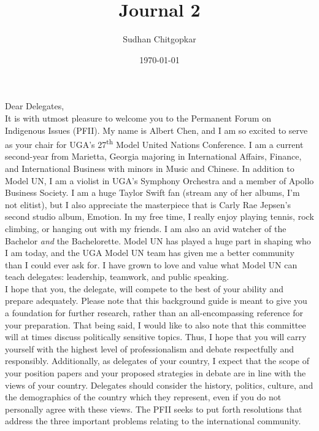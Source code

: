 \documentclass[10pt, letterpaper]{article}
\title{Journal 2}
\author{Sudhan Chitgopkar}
\date{\today}
\begin{document}
Dear Delegates, \\

It is with utmost pleasure to welcome you to the Permanent Forum on
Indigenous Issues (PFII). My name is Albert Chen, and I am so excited to
serve as your chair for UGA's 27\textsuperscript{th} Model United
Nations Conference. I am a current second-year from Marietta, Georgia
majoring in International Affairs, Finance, and International Business
with minors in Music and Chinese. In addition to Model UN, I am a
violist in UGA's Symphony Orchestra and a member of Apollo Business
Society. I am a huge Taylor Swift fan (stream any of her albums, I'm not
elitist), but I also appreciate the masterpiece that is Carly Rae
Jepsen's second studio album, Emotion. In my free time, I really enjoy
playing tennis, rock climbing, or hanging out with my friends. I am also
an avid watcher of the Bachelor \emph{and} the Bachelorette. Model UN
has played a huge part in shaping who I am today, and the UGA Model UN
team has given me a better community than I could ever ask for. I have
grown to love and value what Model UN can teach delegates: leadership,
teamwork, and public speaking. \\

I hope that you, the delegate, will compete to the best of your ability
and prepare adequately. Please note that this background guide is meant
to give you a foundation for further research, rather than an
all-encompassing reference for your preparation. That being said, I
would like to also note that this committee will at times discuss
politically sensitive topics. Thus, I hope that you will carry yourself
with the highest level of professionalism and debate respectfully and
responsibly. Additionally, as delegates of your country, I expect that
the scope of your position papers and your proposed strategies in debate
are in line with the views of your country. Delegates should consider
the history, politics, culture, and the demographics of the country
which they represent, even if you do not personally agree with these
views. The PFII seeks to put forth resolutions that address the three
important problems relating to the international community. \\
\end{document}
